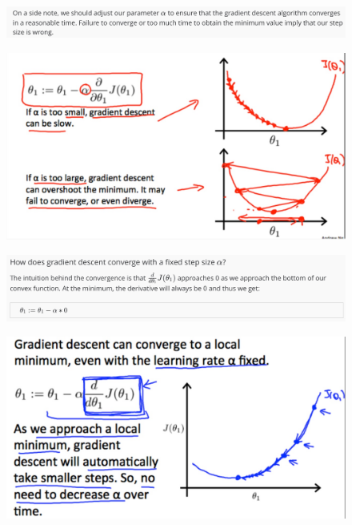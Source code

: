 \documentclass[12pt, A4,onecolumn]{article} %
\begin{document}
\begin{figure}[H]
	\centering
	\includegraphics[width=1\textwidth]{./Imagenes/gradient8}
\end{figure}

\begin{figure}[H]
	\centering
	\includegraphics[width=1\textwidth]{./Imagenes/gradient9}
\end{figure}

\begin{figure}[H]
	\centering
	\includegraphics[width=1\textwidth]{./Imagenes/gradient10}
\end{figure}

\begin{figure}[H]
	\centering
	\includegraphics[width=1\textwidth]{./Imagenes/gradient11}
\end{figure}
\end{document}
